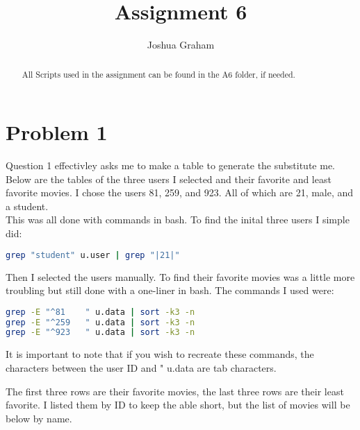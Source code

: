 \documentclass[11pt]{report}
\begin{document}
\title{Assignment 6}
\author{Joshua Graham}

\maketitle
\pagebreak
\begin{abstract}
All Scripts used in the assignment can be found in the A6 folder, if needed.

\end{abstract}
\section{Problem 1}
	Question 1 effectivley asks me to make a table to generate the substitute me. Below are the tables of the three users I selected and their favorite and least favorite movies. I chose the users 81, 259, and 923. All of which are 21, male, and a student. 
\\
This was all done with commands in bash. To find the inital three users I simple did:
\begin{lstlisting}[language=bash,caption={Grep out a simple list of users}]
grep "student" u.user | grep "|21|"
\end{lstlisting}
Then I selected the users manually. To find their favorite movies was a little more troubling but still done with a one-liner in bash. The commands I used were:
\begin{lstlisting}[language=bash,caption={Sort by Rating}]
grep -E "^81	" u.data | sort -k3 -n
grep -E "^259	" u.data | sort -k3 -n
grep -E "^923	" u.data | sort -k3 -n

\end{lstlisting}
It is important to note that if you wish to recreate these commands, the characters between the user ID and " u.data are tab characters.

The first three rows are their favorite movies, the last three rows are their least favorite. I listed them by ID to keep the able short, but the list of movies will be below by name.
\end{document}
